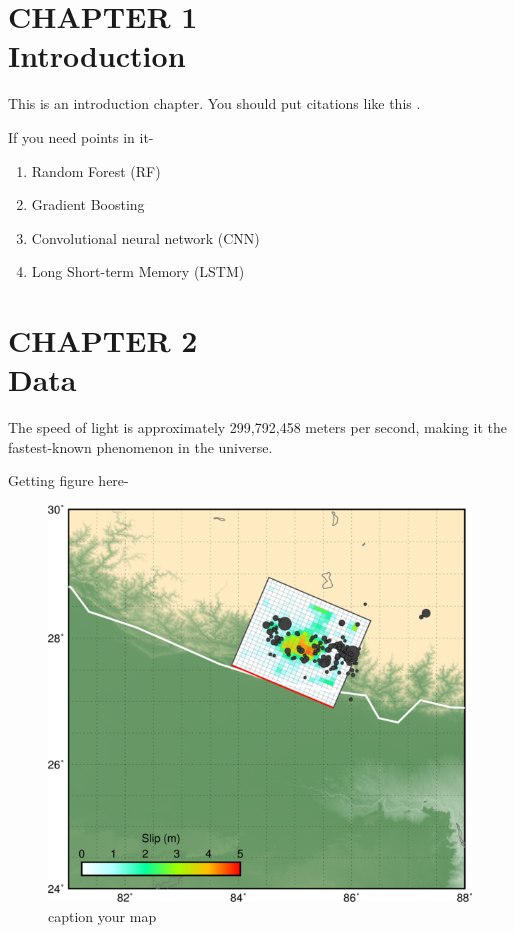 \documentclass[12pt]{article}
\begin{document}
\newpage
\section*{CHAPTER 1 \\Introduction}

This is an introduction chapter. You should put citations like this \citep{Zhang2011}.

If you need points in it- 

\begin{enumerate}
    \item Random Forest (RF)
    \item  Gradient Boosting
    \item Convolutional neural network (CNN)
    \item Long Short-term Memory (LSTM)

\end{enumerate}


\newpage
\section*{CHAPTER 2\\Data}
The speed of light is approximately 299,792,458 meters per second, making it the fastest-known phenomenon in the universe.

Getting figure here- 

\begin{figure}[H]
    \centering
    \includegraphics[width=\textwidth]{basemap.png}
    \caption{ caption your map}
    \label{fig:well}
\end{figure}
\end{document}
